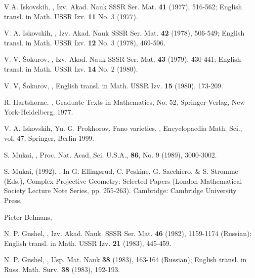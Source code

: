 \documentclass[11pt]{amsart}
\theoremstyle{plain}
\theoremstyle{definition}
\theoremstyle{expl}
\begin{document}
\begin{thebibliography}{19}
V.A. Iskovskih, 
,
\newblock Izv. Akad. Nauk SSSR Ser. Mat.  \textbf{41} (1977), 516-562; English transl. in Math. USSR Izv. \textbf{11} No. 3 (1977).

V. A. Iskovskih, 
, 
\newblock Izv. Akad. Nauk SSSR Ser. Mat.
\textbf{42} (1978), 506-549; English transl. in Math. USSR Izv. \textbf{12} No. 3 (1978), 469-506.

V. V. \v{S}okurov, 
,
\newblock Izv. Akad. Nauk SSSR Ser. Mat. \textbf{43} (1979), 430-441; English transl. in Math. USSR Izv. \textbf{14} No. 2 (1980).

V. V, \v{S}okurov, 
,
\newblock English transl. in Math. USSR Izv. \textbf{15} (1980), 173-209.

R. Hartshorne.
,
\newblock Graduate Texts in Mathematics, No. 52, Springer-Verlag, New York-Heidelberg, 1977.
	
V. A. Iskovskih, Yu. G. Prokhorov, Fano varieties,
,
\newblock Encyclopaedia Math. Sci., vol. 47, Springer, Berlin 1999.

S. Mukai,
,
\newblock Proc. Nat. Acad. Sci. U.S.A., \textbf{86}, No. 9 (1989), 3000-3002.

S. Mukai, (1992). 
,
\newblock In G. Ellingsrud, C. Peskine, G. Sacchiero, \& S. Stromme (Eds.), Complex Projective Geometry: Selected Papers (London Mathematical Society Lecture Note Series, pp. 255-263). Cambridge: Cambridge University Press. 

Pieter Belmans,

N. P. Gushel,
,
\newblock Izv. Akad. Nauk. SSSR Ser. Mat. \textbf{46} (1982), 1159-1174 (Russian); English transl. in Math. USSR  Izv. \textbf{21} (1983), 445-459.

N. P. Gushel,
,
\newblock Usp. Mat. Nauk \textbf{38} (1983), 163-164 (Russian); English transl. in Russ. Math. Surv. \textbf{38} (1983), 192-193. 


\end{thebibliography}
\end{document}

